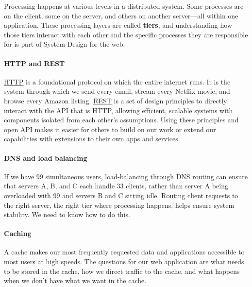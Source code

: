 Processing happens at various levels in a distributed system. Some processes are on the client, some on the server, and others on another server---all within one application. These processing layers are called \textbf{tiers}, and understanding how those tiers interact with each other and the specific processes they are responsible for is part of System Design for the web.

\paragraph{HTTP and REST}\label{_MZ3zIEJ_eeAMn9PYBoyO}

\href{https://www.educative.io/courses/grokking-the-product-architecture-interview/hypertext-transfer-protocol-http}{\ul{HTTP}} is a foundational protocol on which the entire internet runs. It is the system through which we send every email, stream every Netflix movie, and browse every Amazon listing. \href{https://www.educative.io/courses/grokking-the-product-architecture-interview/representational-state-transfer-rest-web-architecture-style}{\ul{REST}} is a set of design principles to directly interact with the API that is HTTP, allowing efficient, scalable systems with components isolated from each other's assumptions. Using these principles and open API makes it easier for others to build on our work or extend our capabilities with extensions to their own apps and services.

\paragraph{DNS and load balancing}\label{PTl0G6dWkKcv-Ks6peIw3}

If we have 99 simultaneous users, load-balancing through DNS routing can ensure that servers A, B, and C each handle 33 clients, rather than server A being overloaded with 99 and servers B and C sitting idle. Routing client requests to the right server, the right tier where processing happens, helps ensure system stability. We need to know how to do this.

\paragraph{Caching}\label{cpBhNp2aqtJUSmgEpwdSn}

A cache makes our most frequently requested data and applications accessible to most users at high speeds. The questions for our web application are what needs to be stored in the cache, how we direct traffic to the cache, and what happens when we don't have what we want in the cache.

